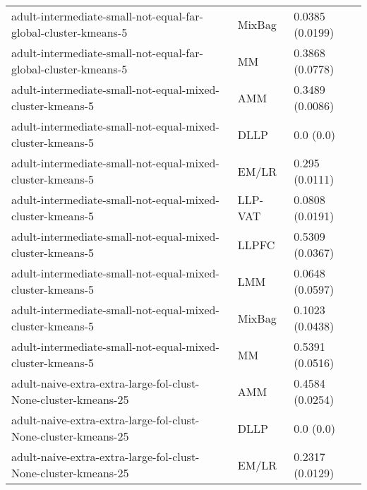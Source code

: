 \begin{longtable}{lll}
                                               adult-intermediate-small-not-equal-far-global-cluster-kmeans-5 &    MixBag &                           0.0385 (0.0199) \\
                                               adult-intermediate-small-not-equal-far-global-cluster-kmeans-5 &        MM &                           0.3868 (0.0778) \\
                                                    adult-intermediate-small-not-equal-mixed-cluster-kmeans-5 &       AMM &                           0.3489 (0.0086) \\
                                                    adult-intermediate-small-not-equal-mixed-cluster-kmeans-5 &      DLLP &                                 0.0 (0.0) \\
                                                    adult-intermediate-small-not-equal-mixed-cluster-kmeans-5 &     EM/LR &                            0.295 (0.0111) \\
                                                    adult-intermediate-small-not-equal-mixed-cluster-kmeans-5 &   LLP-VAT &                           0.0808 (0.0191) \\
                                                    adult-intermediate-small-not-equal-mixed-cluster-kmeans-5 &     LLPFC &                           0.5309 (0.0367) \\
                                                    adult-intermediate-small-not-equal-mixed-cluster-kmeans-5 &       LMM &                           0.0648 (0.0597) \\
                                                    adult-intermediate-small-not-equal-mixed-cluster-kmeans-5 &    MixBag &                           0.1023 (0.0438) \\
                                                    adult-intermediate-small-not-equal-mixed-cluster-kmeans-5 &        MM &                           0.5391 (0.0516) \\
                                               adult-naive-extra-extra-large-fol-clust-None-cluster-kmeans-25 &       AMM &                           0.4584 (0.0254) \\
                                               adult-naive-extra-extra-large-fol-clust-None-cluster-kmeans-25 &      DLLP &                                 0.0 (0.0) \\
                                               adult-naive-extra-extra-large-fol-clust-None-cluster-kmeans-25 &     EM/LR &                           0.2317 (0.0129) \\

\end{longtable}
